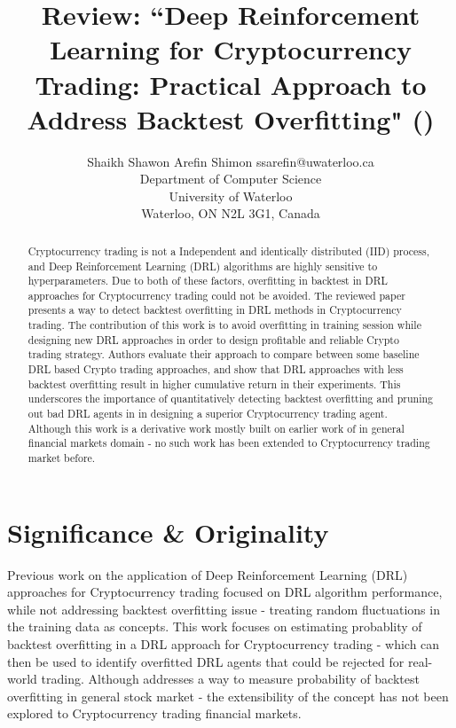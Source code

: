 \documentclass[twoside,11pt]{article}
\begin{document}
\title{Review: ``Deep Reinforcement Learning for Cryptocurrency Trading:
Practical Approach to Address Backtest Overfitting" (\cite{https://doi.org/10.48550/arxiv.2209.05559})}

\author{\name Shaikh Shawon Arefin Shimon \email ssarefin@uwaterloo.ca \\
       \addr Department of Computer Science\\
       University of Waterloo\\
       Waterloo, ON N2L 3G1, Canada}


\maketitle

\begin{abstract}%
Cryptocurrency trading is not a Independent and identically distributed (IID) process, and Deep Reinforcement Learning (DRL) algorithms are highly sensitive to hyperparameters. Due to both of these factors, overfitting in backtest in DRL approaches for Cryptocurrency trading could not be avoided. The reviewed paper presents a way to detect backtest overfitting in DRL methods in Cryptocurrency trading. The contribution of this work is to avoid overfitting in training session while designing new DRL approaches in order to design profitable and reliable Crypto trading strategy. Authors evaluate their approach to compare between some baseline DRL based Crypto trading approaches, and show that DRL approaches with less backtest overfitting result in higher cumulative return in their experiments. This underscores the importance of quantitatively detecting backtest overfitting and pruning out bad DRL agents in in designing a superior Cryptocurrency trading agent. Although this work is a derivative work mostly built on earlier work of \cite{bailey2016probability} in general financial markets domain - no such work has been extended to Cryptocurrency trading market before.
\end{abstract}

\section{Significance \& Originality}
Previous work on the application of Deep Reinforcement Learning (DRL) approaches for Cryptocurrency trading focused on DRL algorithm performance, while not addressing backtest overfitting issue - treating random fluctuations in the training data as concepts. This work focuses on estimating probablity of backtest overfitting in a DRL approach for Cryptocurrency trading - which can then be used to identify overfitted DRL agents that could be rejected for real-world trading. Although \cite{bailey2016probability} addresses a way to measure probability of backtest overfitting in general stock market - the extensibility of the concept has not been explored to Cryptocurrency trading financial markets. 
\end{document}
